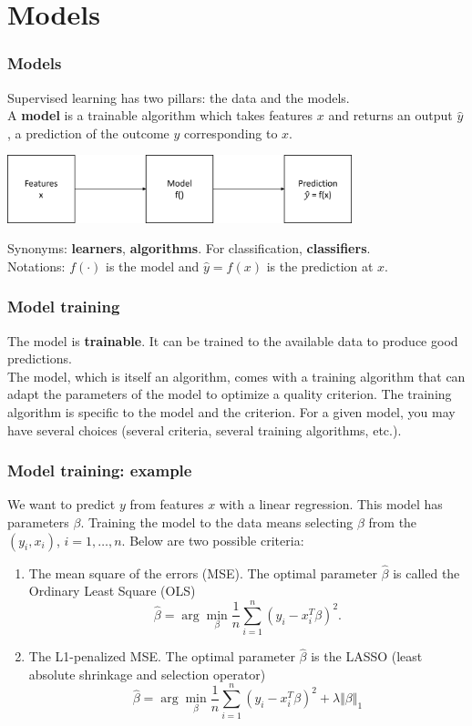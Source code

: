 \section{Models}
\begin{frame}
\frametitle{Models}
Supervised learning has two pillars: the data and the models.\\
\vspace{0.3cm}
A {\bf model} is a trainable algorithm which takes features $x$ and returns an output $\hat{y}$, a prediction of the outcome $y$ corresponding to $x$.
\begin{center}
\includegraphics[width=10cm]{../Graphs/ML1.png}
\end{center}
Synonyms: {\bf learners}, {\bf algorithms}. For classification, {\bf classifiers}. \\
\vspace{0.3cm}
Notations: $f(\cdot)$ is the model and $\hat{y} = f(x)$ is the prediction at $x$.
\end{frame}
\begin{frame}
\frametitle{Model training}
The model is {\bf trainable}. It can be trained to the available data to produce good predictions.\\
\vspace{0.3cm}
The model, which is itself an algorithm, comes with a training algorithm that can adapt the parameters of the model to optimize a quality criterion. The training algorithm is specific to the model and the criterion. For a given model, you may have several choices (several criteria, several training algorithms, etc.).
\end{frame}
\begin{frame}
\frametitle{Model training: example}
We want to predict $y$ from features $x$ with a linear regression. This model has parameters $\beta$. Training the model to the data means selecting $\beta$ from the $(y_i,x_i)$, $i=1,\ldots,n$. Below are two possible criteria:
\begin{enumerate}
\item The mean square of the errors (MSE). The optimal parameter $\hat{\beta}$ is called the Ordinary Least Square (OLS) 
$$
\hat{\beta} = \arg\min_\beta \frac{1}{n}\sum_{i=1}^n (y_i - x_i^T \beta)^2.
$$
\item The L1-penalized MSE. The optimal parameter $\hat{\beta}$ is the LASSO (least absolute shrinkage and selection operator) 
$$
\hat{\beta} = \arg\min_\beta \frac{1}{n}\sum_{i=1}^n (y_i - x_i^T \beta)^2 + \lambda \Vert \beta\Vert_1
$$
\end{enumerate}
\end{frame}

